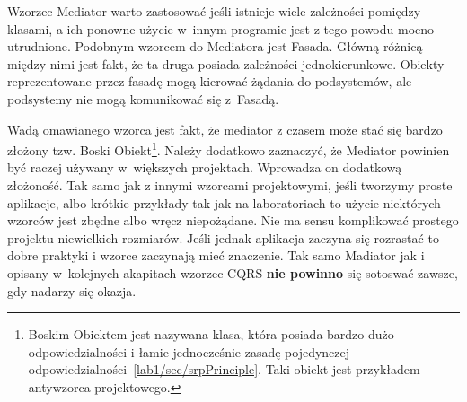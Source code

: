 Wzorzec Mediator warto zastosować jeśli istnieje wiele zależności pomiędzy klasami, a ich ponowne użycie w~innym programie jest z tego powodu mocno utrudnione. Podobnym wzorcem do Mediatora jest Fasada. Główną różnicą między nimi jest fakt, że ta druga posiada zależności jednokierunkowe. Obiekty reprezentowane przez fasadę mogą kierować żądania do podsystemów, ale podsystemy nie mogą komunikować się z~Fasadą.

Wadą omawianego wzorca jest fakt, że mediator z czasem może stać się bardzo złożony tzw. Boski Obiekt\footnote{Boskim Obiektem jest nazywana klasa, która posiada bardzo dużo odpowiedzialności i łamie jednocześnie zasadę pojedynczej odpowiedzialności~\ref{lab1/sec/srpPrinciple}. Taki obiekt jest przykładem antywzorca projektowego.}. Należy dodatkowo zaznaczyć, że Mediator powinien być raczej używany w~większych projektach. Wprowadza on dodatkową złożoność. Tak samo jak z innymi wzorcami projektowymi, jeśli tworzymy proste aplikacje, albo krótkie przykłady tak jak na laboratoriach to użycie niektórych wzorców jest zbędne albo wręcz niepożądane. Nie ma sensu komplikować prostego projektu niewielkich rozmiarów.
Jeśli jednak aplikacja zaczyna się rozrastać to dobre praktyki i wzorce zaczynają mieć znaczenie. %
Tak samo Madiator jak i opisany w~kolejnych akapitach wzorzec CQRS \textbf{nie powinno} się sotoswać zawsze, gdy nadarzy się okazja.

